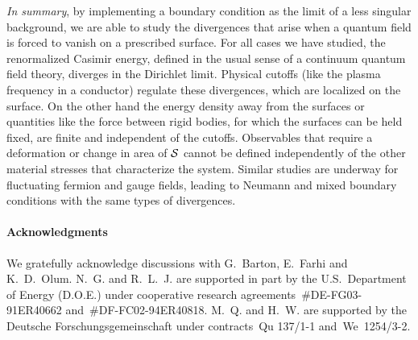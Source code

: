\documentclass[a4paper,aps,amsfonts,prl,showpacs,nobibnotes,nofootinbib,%
tightenlines,twocolumn]{revtex4}
\begin{document}
\emph{In summary}, by implementing a boundary condition as the limit
of a less singular background, we are able to study the divergences
that arise when a quantum field is forced to vanish on a prescribed
surface.  For all cases we have studied, the renormalized
Casimir energy, defined in the usual sense of a continuum quantum
field theory, diverges in the Dirichlet limit. Physical cutoffs (like
the plasma frequency in a conductor) regulate these divergences,  
which are localized on the surface.  On the other hand the
energy density away from the surfaces or quantities like the force
between rigid bodies, for which the surfaces can be held fixed, are
finite and independent of the cutoffs.  Observables that require a
deformation or change in area of ${\cal S}$ cannot be defined
independently of the other material stresses that characterize the
system.  Similar studies are underway for fluctuating fermion
and gauge fields, leading to Neumann and mixed boundary conditions
with the same types of divergences.  \bigskip

\paragraph{Acknowledgments}
We gratefully acknowledge discussions with G.~Barton, E.~Farhi and
K.~D.~Olum.  N.~G. and R.~L.~J. are supported in part by the
U.S.~Department of Energy (D.O.E.) under cooperative research
agreements~\#DE-FG03-91ER40662 and~\#DF-FC02-94ER40818.  M.~Q. and
H.~W. are supported by the Deutsche Forschungsgemeinschaft under
contracts~Qu 137/1-1 and~We~1254/3-2.
\end{document}
